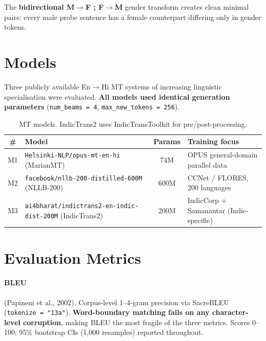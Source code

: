 \documentclass[11pt,a4paper]{article}
\begin{document}
The \textbf{bidirectional M$\to$F ; F$\to$M} gender transform creates clean minimal
pairs: every male probe sentence has a female counterpart differing only in
gender tokens.

\section{Models}

Three publicly available En$\to$Hi MT systems of increasing linguistic
specialisation were evaluated. \textbf{All models used identical generation
parameters} (\texttt{num\_beams\,=\,4}, \texttt{max\_new\_tokens\,=\,256}).

\begin{table}[htbp]\centering\small\setlength{\tabcolsep}{5pt}
\begin{tabular}{clcl}
\toprule
\textbf{\#} & \textbf{Model} & \textbf{Params} & \textbf{Training focus}\\
\midrule
M1 & \texttt{Helsinki-NLP/opus-mt-en-hi} (MarianMT)
   & 74M  & OPUS general-domain parallel data\\
M2 & \texttt{facebook/nllb-200-distilled-600M} (NLLB-200)
   & 600M & CCNet / FLORES, 200 languages\\
M3 & \texttt{ai4bharat/indictrans2-en-indic-dist-200M} (IndicTrans2)
   & 200M & IndicCorp + Samanantar (Indic-specific)\\
\bottomrule
\end{tabular}
\caption{MT models. IndicTrans2 uses IndicTransToolkit for pre/post-processing.}
\label{tab:models}
\end{table}

\section{Evaluation Metrics}

\paragraph{BLEU} (Papineni et al., 2002).
Corpus-level 1--4-gram precision via SacreBLEU (\texttt{tokenize\,=\,"13a"}).
\textbf{Word-boundary matching fails on any character-level corruption}, making
BLEU the most fragile of the three metrics. Scores 0--100; 95\% bootstrap CIs
(1,000 resamples) reported throughout.
\end{document}
